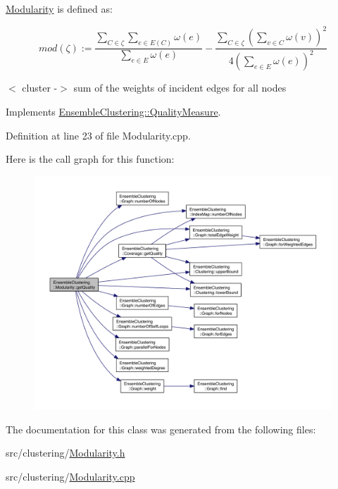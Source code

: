 \hyperlink{class_ensemble_clustering_1_1_modularity}{Modularity} is defined as\-: \begin{DoxyVerb}$$mod(\zeta) := \frac{\sum_{C \in \zeta} \sum_{ e \in E(C) } \omega(e)}{\sum_{e \in E} \omega(e)}
- \frac{ \sum_{C \in \zeta}( \sum_{v \in C} \omega(v) )^2 }{4( \sum_{e \in E} \omega(e) )^2 }$$\end{DoxyVerb}
 $<$ cluster -\/$>$ sum of the weights of incident edges for all nodes 

Implements \hyperlink{class_ensemble_clustering_1_1_quality_measure_aadeac7e03b1fa099669d3b1e93edd1e9}{Ensemble\-Clustering\-::\-Quality\-Measure}.



Definition at line 23 of file Modularity.\-cpp.



Here is the call graph for this function\-:
\nopagebreak
\begin{figure}[H]
\begin{center}
\leavevmode
\includegraphics[width=350pt]{class_ensemble_clustering_1_1_modularity_a90ed724bb4be6b25207620c20c4be962_cgraph}
\end{center}
\end{figure}




The documentation for this class was generated from the following files\-:\begin{DoxyCompactItemize}
\item 
src/clustering/\hyperlink{_modularity_8h}{Modularity.\-h}\item 
src/clustering/\hyperlink{_modularity_8cpp}{Modularity.\-cpp}\end{DoxyCompactItemize}
